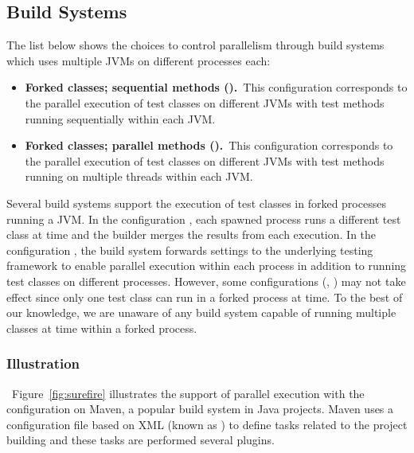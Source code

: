 \subsection{Build Systems}
\label{sec:builder}

The list below shows the choices to control parallelism through build
systems which uses multiple JVMs on different processes each:

\begin{itemize}
\item
    \textbf{Forked classes; sequential methods (\ForkSeq).}~This
        configuration corresponds to the parallel execution of test
        classes on different JVMs with test methods running
        sequentially within each JVM.
\item
    \textbf{Forked classes; parallel methods (\ForkParMeth).}~This
        configuration corresponds to the parallel execution of test
        classes on different JVMs with test methods running on
        multiple threads within each JVM.
\end{itemize}

Several build systems support the execution of test classes in forked
processes running a JVM. In the configuration \ForkSeq{}, each spawned
process runs a different test class at time and the builder merges the
results from each execution. In the configuration \ForkParMeth{}, the
build system forwards settings to the underlying testing framework to
enable parallel execution within each process in addition to running
test classes on different processes.  However, some configurations
(\eg, \ParClassSeqMeth) may not take effect since only one test class
can run in a forked process at time.  To the best of our knowledge, we
are unaware of any build system capable of running multiple classes at
time within a forked process.

\subsubsection*{Illustration}~Figure~\ref{fig:surefire} illustrates
the support of parallel execution with the configuration
\ForkParMeth{} on Maven, a popular build system in Java projects.
Maven uses a configuration file based on XML (known as \pomf{}) to
define tasks related to the project building and these tasks are
performed several plugins. 

